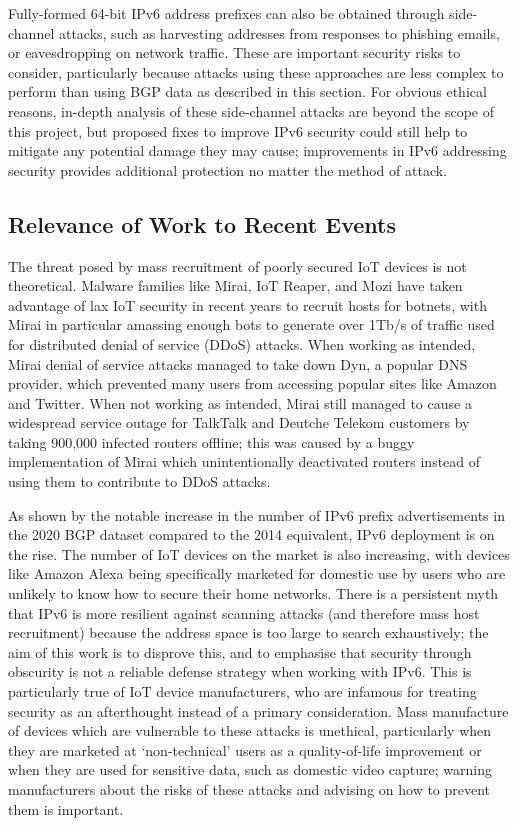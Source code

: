 \documentclass[10pt,sigconf]{acmart}
\begin{document}
Fully-formed 64-bit IPv6 address prefixes can also be obtained through side-channel attacks, such as harvesting addresses from responses to phishing emails, or eavesdropping on network traffic.
These are important security risks to consider, particularly because attacks using these approaches are less complex to perform than using BGP data as described in this section.
For obvious ethical reasons, in-depth analysis of these side-channel attacks are beyond the scope of this project, but proposed fixes to improve IPv6 security could still help to mitigate any potential damage they may cause;
improvements in IPv6 addressing security provides additional protection no matter the method of attack.

\subsection{Relevance of Work to Recent Events}
The threat posed by mass recruitment of poorly secured IoT devices is not theoretical.
Malware families like Mirai, IoT Reaper, and Mozi have taken advantage of lax IoT security in recent years to recruit hosts for botnets, with Mirai in particular amassing enough bots to generate over 1Tb/s of traffic used for distributed denial of service (DDoS) attacks.
When working as intended, Mirai denial of service attacks managed to take down Dyn, a popular DNS provider, which prevented many users from accessing popular sites like Amazon and Twitter.
When not working as intended, Mirai still managed to cause a widespread service outage for TalkTalk and Deutche Telekom customers by taking 900,000 infected routers offline;
this was caused by a buggy implementation of Mirai which unintentionally deactivated routers instead of using them to contribute to DDoS attacks.

As shown by the notable increase in the number of IPv6 prefix advertisements in the 2020 BGP dataset compared to the 2014 equivalent, IPv6 deployment is on the rise.
The number of IoT devices on the market is also increasing, with devices like Amazon Alexa being specifically marketed for domestic use by users who are unlikely to know how to secure their home networks.
There is a persistent myth that IPv6 is more resilient against scanning attacks (and therefore mass host recruitment) because the address space is too large to search exhaustively;
the aim of this work is to disprove this, and to emphasise that security through obscurity is not a reliable defense strategy when working with IPv6.
This is particularly true of IoT device manufacturers, who are infamous for treating security as an afterthought instead of a primary consideration.
Mass manufacture of devices which are vulnerable to these attacks is unethical, particularly when they are marketed at `non-technical' users as a quality-of-life improvement or when they are used for sensitive data, such as domestic video capture;
warning manufacturers about the risks of these attacks and advising on how to prevent them is important.
\end{document}
